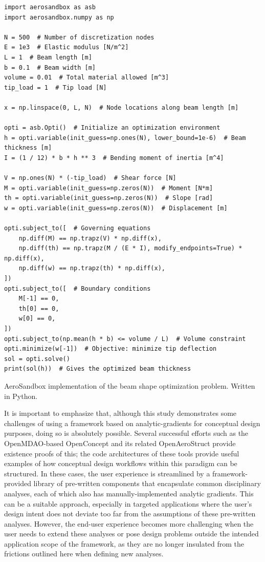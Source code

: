 \begin{listing}[h]
    \begin{verbatim}
import aerosandbox as asb
import aerosandbox.numpy as np

N = 500  # Number of discretization nodes
E = 1e3  # Elastic modulus [N/m^2]
L = 1  # Beam length [m]
b = 0.1  # Beam width [m]
volume = 0.01  # Total material allowed [m^3]
tip_load = 1  # Tip load [N]

x = np.linspace(0, L, N)  # Node locations along beam length [m]

opti = asb.Opti()  # Initialize an optimization environment
h = opti.variable(init_guess=np.ones(N), lower_bound=1e-6)  # Beam thickness [m]
I = (1 / 12) * b * h ** 3  # Bending moment of inertia [m^4]

V = np.ones(N) * (-tip_load)  # Shear force [N]
M = opti.variable(init_guess=np.zeros(N))  # Moment [N*m]
th = opti.variable(init_guess=np.zeros(N))  # Slope [rad]
w = opti.variable(init_guess=np.zeros(N))  # Displacement [m]

opti.subject_to([  # Governing equations
    np.diff(M) == np.trapz(V) * np.diff(x),
    np.diff(th) == np.trapz(M / (E * I), modify_endpoints=True) * np.diff(x),
    np.diff(w) == np.trapz(th) * np.diff(x),
])
opti.subject_to([  # Boundary conditions
    M[-1] == 0,
    th[0] == 0,
    w[0] == 0,
])
opti.subject_to(np.mean(h * b) <= volume / L)  # Volume constraint
opti.minimize(w[-1])  # Objective: minimize tip deflection
sol = opti.solve()
print(sol(h))  # Gives the optimized beam thickness
    \end{verbatim}
    \caption{AeroSandbox implementation of the beam shape optimization problem. Written in Python.}
    \label{lst:om_beam}
\end{listing}

It is important to emphasize that, although this study demonstrates some challenges of using a framework based on analytic-gradients for conceptual design purposes, doing so is absolutely possible. Several successful efforts such as the OpenMDAO-based OpenConcept \cite{Brelje2018a} and its related OpenAeroStruct \cite{Adler2022d} provide existence proofs of this; the code architectures of these tools provide useful examples of how conceptual design workflows within this paradigm can be structured. In these cases, the user experience is streamlined by a framework-provided library of pre-written components that encapsulate common disciplinary analyses, each of which also has manually-implemented analytic gradients. This can be a suitable approach, especially in targeted applications where the user's design intent does not deviate too far from the assumptions of these pre-written analyses. However, the end-user experience becomes more challenging when the user needs to extend these analyses or pose design problems outside the intended application scope of the framework, as they are no longer insulated from the frictions outlined here when defining new analyses.

